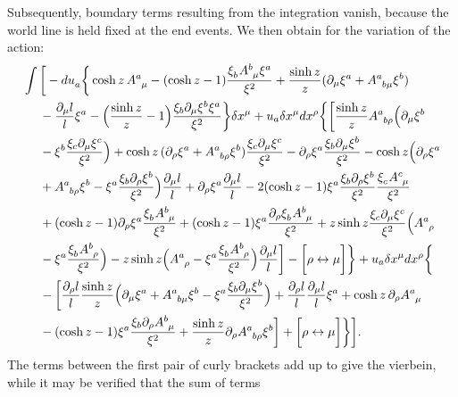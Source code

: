 \documentclass[
final,
11pt,
a4paper,
DIV=11,
headinclude=true,
footinclude=false,
bibliography=totoc,
twoside=true,  %
BCOR=5mm
]{scrbook}
\begin{document}
\begin{subappendices}
Subsequently, boundary terms resulting from the integration 
vanish, because the world line is held fixed at the end events.  
We then obtain for the variation of the action:
\begin{align*}
  &\int \bigg[ -du\ind{_a} \bigg\{ \cosh z\, A\ind{^a_\mu} 
  - (\cosh z - 1) \frac{\xi\ind{_b} A\ind{^b_\mu} \xi^a}{\xi^2} 
  + \frac{\sinh z}{z}(\pd_\mu \xi^a + A\ind{^a_{b\mu}} 
  \xi^b)
  \\
  &\nla{} - \frac{\pd_\mu l}{l} \xi^a - \Big( \frac{\sinh z}{z} 
  - 1 \Big) \frac{\xi_b \pd_\mu \xi^b \xi^a}{\xi^2} \bigg\} 
  \delta x^\mu + u_a \delta x^\mu dx^\rho \bigg\{ \bigg[ 
  \frac{\sinh z}{z} A\ind{^a_{b\rho}} \Big( \pd_\mu \xi^b
  \\
  &\nla{} - \xi^b \frac{\xi_c \pd_\mu \xi^c}{\xi^2} \Big) + 
  \cosh z\, ( \pd_\rho \xi^a + A\ind{^a_{b\rho}} \xi^b )  
  \frac{\xi_c \pd_\mu \xi^c}{\xi^2} - \pd_\rho \xi^a \frac{\xi_b 
    \pd_\mu \xi^b}{\xi^2} - \cosh z \Big( \pd_\rho \xi^a
  \\
  &\nla{} + A\ind{^a_{b\rho}} \xi^b - \xi^a \frac{\xi_b 
    \pd_\rho \xi^b}{\xi^2} \Big) \frac{\pd_\mu l}{l} + \pd_\rho 
  \xi^a \frac{\pd_\mu l}{l} - 2(\cosh z - 1) \xi^a \frac{\xi_b 
    \pd_\rho \xi^b}{\xi^2} \frac{\xi\ind{_c} 
    A\ind{^c_\mu}}{\xi^2}
  \\
  &\nla{} + (\cosh z - 1) \pd_\rho \xi^a \frac{\xi\ind{_b} 
    A\ind{^b_\mu}}{\xi^2} + (\cosh z - 1) \xi^a \frac{\pd_\rho 
    \xi\ind{_b} A\ind{^b_\mu}}{\xi^2} + z\sinh z \frac{\xi_c 
    \pd_\mu \xi^c}{\xi^2} \Big( A\ind{^a_\rho}
  \\
  &\nla{} - \xi^a \frac{\xi\ind{_b} A\ind{^b_\rho}}{\xi^2} \Big) 
  - z \sinh z \Big( A\ind{^a_\rho} - \xi^a \frac{\xi\ind{_b} 
    A\ind{^b_\rho}}{\xi^2} \Big) \frac{\pd_\mu l}{l} \bigg] - 
  \bigg[ \rho \leftrightarrow \mu \bigg] \bigg\} + u_a 
    \delta x^\mu dx^\rho \bigg\{
    \\
    &\nla{} -\bigg[ \frac{\pd_\rho l}{l} \frac{\sinh z}{z} \Big( 
    \pd_\mu \xi^a + A\ind{^a_{b\mu}} \xi^b - \xi^a 
    \frac{\xi_b \pd_\mu \xi^b}{\xi^2} \Big) + \frac{\pd_\rho l}{l} 
    \frac{\pd_\mu l}{l} \xi^a + \cosh z\, \pd_\rho A\ind{^a_\mu}
    \\
    &\nla{} - (\cosh z - 1) \xi^a \frac{\xi_b \pd_\rho 
      A\ind{^b_\mu}}{\xi^2} + \frac{\sinh z}{z} \pd_\rho 
    A\ind{^a_{b\rho}} \xi^b	\bigg] + \bigg[ \rho 
    \leftrightarrow \mu \bigg] \bigg\} \bigg].
\end{align*}
The terms between the first pair of curly brackets add up to give 
the vierbein, while it may be verified that the sum of terms 

\end{subappendices}
\end{document}

